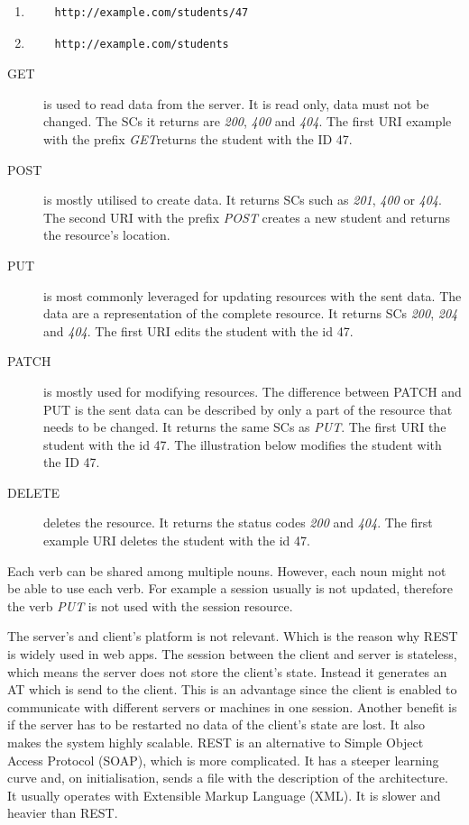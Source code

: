 	\begin{enumerate}
	\item 
	\lstset{style=sharpc}
	\begin{lstlisting}
	http://example.com/students/47
	\end{lstlisting}
	
	\item 
	\lstset{style=sharpc}
	\begin{lstlisting}
	http://example.com/students
	\end{lstlisting}
	\end{enumerate}
	
	\begin {description}
	\item [GET] is used to read data from the server. It is read only, data must not be changed. The SCs it returns are \textit{200}, \textit{400} and \textit{404}. The first URI example with the prefix \textit{GET}returns the student with the ID 47.
	\item [POST] is mostly utilised to create data. It returns SCs such as \textit{201}, \textit{400} or \textit{404}. The second URI with the prefix \textit{POST} creates a new student and returns the resource's location.		
	\item [PUT] is most commonly leveraged for updating resources with the sent data. The data are a representation of the complete resource. It returns SCs \textit{200}, \textit{204} and \textit{404}. The first URI edits the student with the id 47.
	\item [PATCH] is mostly used for modifying resources. The difference between PATCH and PUT is the sent data can be described by only a part of the resource that needs to be changed. It returns the same SCs as \textit{PUT}. The first URI the student with the id 47. The illustration below modifies the student with the ID 47.
	\item [DELETE] deletes the resource. It returns the status codes \textit{200} and \textit{404}. The first example URI deletes the student with the id 47.
	\end{description}
	Each verb can be shared among multiple nouns. However, each noun might not be able to use each verb. For example a session usually is not updated, therefore the verb \textit{PUT} is not used with the session resource.
	
	The server's and client's platform is not relevant. Which is the reason why REST is widely used in web apps. The session between the client and server is stateless, which means the server does not store the client's state. Instead it generates an AT which is send to the client. This is an advantage since the client is enabled to communicate with different servers or machines in one session. Another benefit is if the server has to be restarted no data of the client's state are lost. It also makes the system highly scalable. REST is an alternative to Simple Object Access Protocol (SOAP), which is more complicated. It has a steeper learning curve and, on initialisation, sends a file with the description of the architecture. It usually operates with Extensible Markup Language (XML). It is slower and heavier than REST. 

